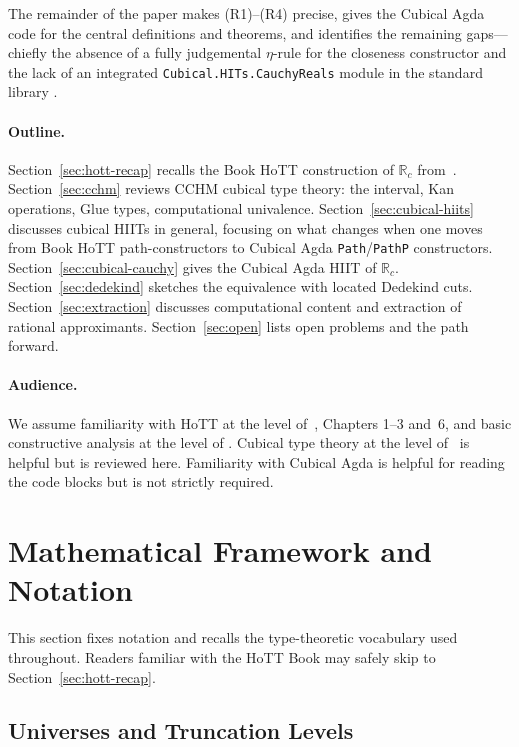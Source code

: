 \documentclass[12pt]{article}
\theoremstyle{definition}
\theoremstyle{remark}
\newcommand{\Rc}{\mathbb{R}_{c}}
\begin{document}
The remainder of the paper makes (R1)--(R4) precise, gives the Cubical
Agda code for the central definitions and theorems, and identifies the
remaining gaps---chiefly the absence of a fully judgemental $\eta$-rule
for the closeness constructor and the lack of an integrated
\texttt{Cubical.HITs.CauchyReals} module in the standard library
\cite{CubicalAgdaLib}.

\paragraph{Outline.}
Section~\ref{sec:hott-recap} recalls the Book HoTT construction of $\Rc$
from~\cite{HoTTBook,Booij2020}.
Section~\ref{sec:cchm} reviews CCHM cubical type theory: the interval, Kan
operations, Glue types, computational univalence.
Section~\ref{sec:cubical-hiits} discusses cubical HIITs in general,
focusing on what changes when one moves from Book HoTT path-constructors
to Cubical Agda \texttt{Path}/\texttt{PathP} constructors.
Section~\ref{sec:cubical-cauchy} gives the Cubical Agda HIIT of $\Rc$.
Section~\ref{sec:dedekind} sketches the equivalence with located Dedekind
cuts.
Section~\ref{sec:extraction} discusses computational content and
extraction of rational approximants.
Section~\ref{sec:open} lists open problems and the path forward.

\paragraph{Audience.}
We assume familiarity with HoTT at the level of~\cite{HoTTBook}, Chapters
1--3 and~6, and basic constructive analysis at the level of
\cite{BridgesRichman}. Cubical type theory at the level of~\cite{CCHM} is
helpful but is reviewed here. Familiarity with Cubical Agda
\cite{CubicalAgda} is helpful for reading the code blocks but is not
strictly required.

\section{Mathematical Framework and Notation}
\label{sec:framework}

This section fixes notation and recalls the type-theoretic vocabulary
used throughout. Readers familiar with the HoTT Book may safely skip
to Section~\ref{sec:hott-recap}.

\subsection{Universes and Truncation Levels}
\end{document}
